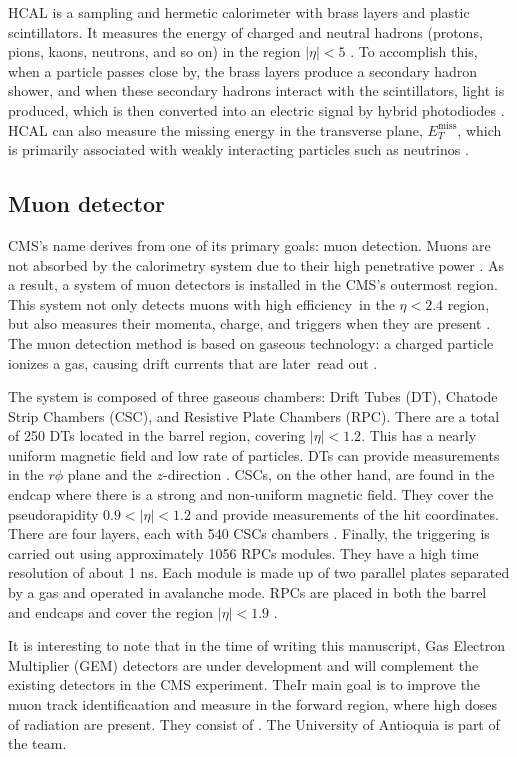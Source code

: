 HCAL is a sampling and hermetic calorimeter with brass layers and plastic scintillators. It measures the energy of charged and neutral hadrons (protons, pions, kaons, neutrons, and so on) in the region $|\eta| < 5$ \cite{li2021measurements, muhammad2021measurement}. To accomplish this, when a particle passes close by, the brass layers produce a secondary hadron shower, and when these secondary hadrons interact with the scintillators, light is produced, which is then converted into an electric signal by hybrid photodiodes \cite{baron2018desarrollo, muhammad2021measurement}. HCAL can also measure the missing energy in the transverse plane, $E^{\text{miss}}_T$, which is primarily associated with weakly interacting particles such as neutrinos \cite{di2020measurement}.
\subsection{Muon detector}
CMS's name derives from one of its primary goals: muon detection. Muons are not absorbed by the calorimetry system due to their high penetrative power \cite{di2020measurement, baron2018desarrollo}. As a result, a system of muon detectors is installed in the CMS's outermost region. This system not only detects muons with high efficiency in the $\eta < 2.4$ region, but also measures their momenta, charge, and triggers when they are present \cite{sanchez2020search}. The muon detection method is based on gaseous technology: a charged particle ionizes a gas, causing drift currents that are later read out \cite{danilov2020measurement, baron2018desarrollo}.

The system is composed of three gaseous chambers: Drift Tubes (DT), Chatode Strip Chambers (CSC), and Resistive Plate Chambers (RPC). There are a total of 250 DTs located in the barrel region, covering $|\eta| < 1.2$. This has a nearly uniform magnetic field and low rate of particles. DTs can provide measurements in the $r\phi$ plane and the $z$-direction \cite{bragagnolo2021measurement, di2020measurement, muhammad2021measurement}. CSCs, on the other hand, are found in the endcap where there is a strong and non-uniform magnetic field. They cover the pseudorapidity $0.9 < |\eta| < 1.2$ and provide measurements of the hit coordinates. There are four layers, each with 540 CSCs chambers \cite{lechner2021measurement, muhammad2021measurement}. Finally, the triggering is carried out using approximately 1056 RPCs modules. They have a high time resolution of about 1 ns. Each module is made up of two parallel plates separated by a gas and operated in avalanche mode. RPCs are placed in both the barrel and endcaps and cover the region $|\eta| < 1.9$ \cite{di2020measurement, lechner2021measurement}.

It is interesting to note that in the time of writing this manuscript, Gas Electron Multiplier (GEM) detectors are under development and will complement the existing detectors in the CMS experiment. TheIr main goal is to improve the muon track identificaation and measure in the forward region, where high doses of radiation are present. They consist of . The University of Antioquia is part of the team. 